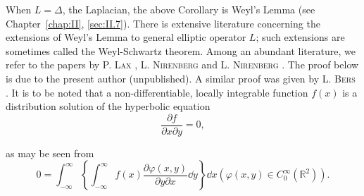 \begin{remarku} When $L = \Delta$, the Laplacian, the above Corollary is Weyl's Lemma (see Chapter~\ref{chap:II}, \ref{sec:II.7}). There is extensive literature concerning the extensions of Weyl's Lemma to general elliptic operator $L$; such extensions are sometimes called the Weyl-Schwartz theorem. Among an abundant literature, we refer to the papers by P. \textsc{Lax} \cite{lewy172}, L. \textsc{Nirenberg} \cite{nirenberg236} and L. \textsc{Nirenberg} \cite{nirenberg237}. The proof below is due to the present author (unpublished). A similar proof was given by L. \textsc{Bers} \cite{bers16}. It is to be noted that a non-differentiable, locally integrable function $f(x)$ is a distribution solution of the hyperbolic equation 
\[
\frac {\partial f}{\partial x \partial y} = 0,
\]
\end{remarku}

as may be seen from 
\[
0 = \int_{- \infty} ^{\infty} \left\{\int_{- \infty} ^{\infty} f (x) \frac {\partial \varphi (x , y)}{\partial y \partial x} \dd y \right\} \dd x (\varphi (x, y) \in C _{0} ^{\infty} (\mathbb{R}^{2})).
\]

